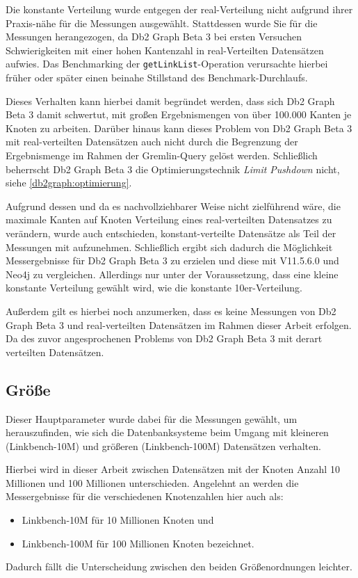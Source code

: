 Die konstante Verteilung wurde entgegen der real-Verteilung nicht aufgrund ihrer Praxis-nähe für die Messungen ausgewählt. Stattdessen wurde Sie für die Messungen herangezogen, da Db2 Graph Beta 3 bei ersten Versuchen Schwierigkeiten mit einer hohen Kantenzahl in real-Verteilten Datensätzen aufwies. Das Benchmarking der \texttt{getLinkList}-Operation verursachte hierbei früher oder später einen beinahe Stillstand des Benchmark-Durchlaufs. 

Dieses Verhalten kann hierbei damit begründet werden, dass sich Db2 Graph Beta 3 damit schwertut, mit großen Ergebnismengen von über 100.000 Kanten je Knoten zu arbeiten. Darüber hinaus kann dieses Problem von Db2 Graph Beta 3 mit real-verteilten Datensätzen auch nicht durch die Begrenzung der Ergebnismenge im Rahmen der Gremlin-Query gelöst werden. Schließlich beherrscht Db2 Graph Beta 3 die Optimierungstechnik \textit{Limit Pushdown} nicht, siehe \autoref{db2graph:optimierung}. 

Aufgrund dessen und da es nachvollziehbarer Weise nicht zielführend wäre, die maximale Kanten auf Knoten Verteilung eines real-verteilten Datensatzes zu verändern, wurde auch entschieden, konstant-verteilte Datensätze als Teil der Messungen mit aufzunehmen. Schließlich ergibt sich dadurch die Möglichkeit Messergebnisse für Db2 Graph Beta 3 zu erzielen und diese mit V11.5.6.0 und Neo4j zu vergleichen. Allerdings nur unter der Voraussetzung, dass eine kleine konstante Verteilung gewählt wird, wie die konstante 10er-Verteilung. 

Außerdem gilt es hierbei noch anzumerken, dass es keine Messungen von Db2 Graph Beta 3 und real-verteilten Datensätzen im Rahmen dieser Arbeit erfolgen. Da des zuvor angesprochenen Problems von Db2 Graph Beta 3 mit derart verteilten Datensätzen.

\subsection{Größe}
Dieser Hauptparameter wurde dabei für die Messungen gewählt, um herauszufinden, wie sich die Datenbanksysteme beim Umgang mit kleineren (Linkbench-10M) und größeren (Linkbench-100M) Datensätzen verhalten. 

Hierbei wird in dieser Arbeit zwischen Datensätzen mit der Knoten Anzahl 10 Millionen und 100 Millionen unterschieden. Angelehnt an \cite{sigmod_tian} werden die Messergebnisse für die verschiedenen Knotenzahlen hier auch als:
\begin{itemize}
    \item Linkbench-10M für 10 Millionen Knoten und 
    \item Linkbench-100M für 100 Millionen Knoten bezeichnet.
\end{itemize}
Dadurch fällt die Unterscheidung zwischen den beiden Größenordnungen leichter. 

